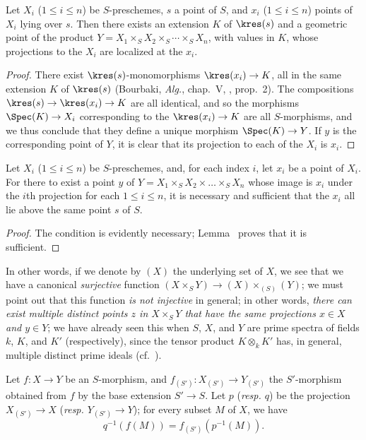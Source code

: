 \begin{lemma}[3.4.6]
\label{I.3.4.6}
Let $X_i$ ($1\leq i\leq n$) be $S$-preschemes, $s$ a point of $S$, and $x_i$
($1\leq i\leq n$) points of $X_i$ lying over $s$. Then there exists an extension
$K$ of $\kres(s)$ and a geometric point of the product
$Y=X_1\times_S X_2\times_S\cdots\times_S X_n$, with values in $K$, whose projections to
the $X_i$ are localized at the $x_i$.
\end{lemma}

\begin{proof}
There exist $\kres(s)$-monomorphisms $\kres(x_i)\to K$, all in the same extension $K$ of $\kres(s)$ (Bourbaki, \emph{Alg.}, chap.~V, , prop.~2).
The compositions $\kres(s)\to\kres(x_i)\to K$ are all identical, and so the morphisms $\Spec(K)\to X_i$ corresponding to the $\kres(x_i)\to K$ are all $S$-morphisms, and we thus conclude that they define a unique morphism $\Spec(K)\to Y$.
If $y$ is the corresponding point of $Y$, it is clear that its projection to each of the $X_i$ is $x_i$.
\end{proof}

\begin{proposition}[3.4.7]
\label{I.3.4.7}
Let $X_i$ ($1\leq i\leq n$) be $S$-preschemes, and, for each index $i$, let $x_i$ be a point of $X_i$.
For there to exist a point $y$ of $Y=X_1\times_S X_2\times\ldots\times_S X_n$ whose image is $x_i$ under the $i$th projection for each $1\leq i\leq n$, it is necessary and sufficient that the $x_i$ all lie above the same point $s$ of $S$.
\end{proposition}

\begin{proof}
The condition is evidently necessary; Lemma~ proves that it is sufficient.
\end{proof}

In other words, if we denote by $(X)$ the underlying set of $X$, we see that we have a canonical \emph{surjective} function $(X\times_S Y)\to(X)\times_{(S)}(Y)$; we must point out that this function \emph{is not injective} in general; in other words, \emph{there can exist multiple distinct points $z$ in $X\times_S Y$ that have the same projections $x\in X$ and $y\in Y$}; we have already seen this when $S$, $X$, and $Y$ are prime spectra of fields $k$, $K$, and $K'$ (respectively), since the tensor product $K\otimes_k K'$ has, in general, multiple distinct prime ideals (cf.~).

\begin{corollary}[3.4.8]
\label{I.3.4.8}
Let $f:X\to Y$ be an $S$-morphism, and $f_{(S')}:X_{(S')}\to Y_{(S')}$ the $S'$-morphism obtained from $f$ by the base extension $S'\to S$.
Let $p$ (\emph{resp. $q$}) be the projection $X_{(S')}\to X$ (\emph{resp. $Y_{(S')}\to Y$}); for every subset $M$ of $X$, we have
\[
  q^{-1}(f(M))=f_{(S')}(p^{-1}(M)).
\]
\end{corollary}

